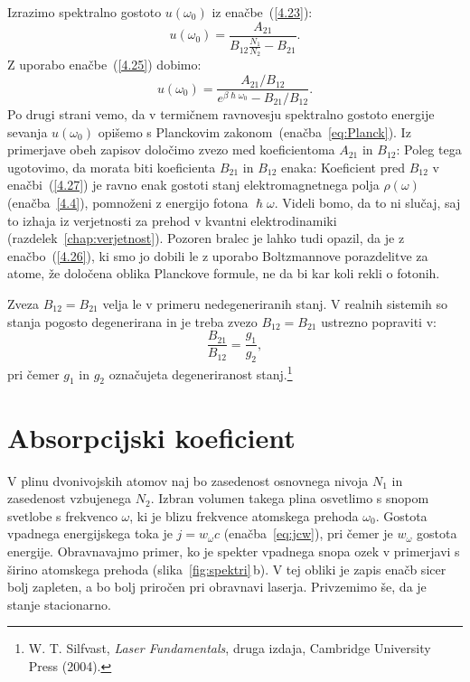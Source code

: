 Izrazimo spektralno gostoto $u(\omega_0)$ 
iz enačbe~(\ref{4.23}):
\begin{equation}
u(\omega_{0})=\frac{A_{21}}{B_{12}\frac{N_{1}}{N_{2}}-B_{21}}.
\label{4.24}
\end{equation}
Z uporabo enačbe~(\ref{4.25}) dobimo:
\begin{equation}
u(\omega_{0})=\frac{A_{21}/B_{12}}{e^{\beta\hslash\omega_{0}}-B_{21}/B_{12}}.
\label{4.26}
\end{equation}
Po drugi strani vemo, da v termičnem ravnovesju spektralno gostoto energije sevanja
$u(\omega_0)$ opišemo s Planckovim zakonom~(enačba~\ref{eq:Planck}).
Iz primerjave obeh zapisov določimo zvezo med koeficientoma $A_{21}$ in $B_{12}$:
Poleg tega ugotovimo, da morata biti koeficienta $B_{21}$ in $B_{12}$ enaka:
Koeficient pred $B_{12}$ v enačbi~(\ref{4.27}) je ravno enak gostoti stanj elektromagnetnega polja 
$\rho(\omega)$ (enačba~\ref{4.4}), pomnoženi z energijo fotona $\hslash\omega$. 
Videli bomo, da to ni slučaj, saj to izhaja iz verjetnosti za prehod v kvantni 
elektrodinamiki (razdelek~\ref{chap:verjetnost}).
Pozoren bralec je lahko tudi opazil, da je z enačbo~(\ref{4.26}),
ki smo jo dobili le z uporabo Boltzmannove porazdelitve za atome, že
določena oblika Planckove formule, ne da bi kar koli rekli o fotonih.

\begin{remark}
 Zveza $B_{12}=B_{21}$ velja le v primeru nedegeneriranih stanj. V realnih sistemih
 so stanja pogosto degenerirana in je treba zvezo $B_{12}=B_{21}$ ustrezno popraviti v:
\begin{equation}
\frac{B_{21}}{B_{12}} = \frac{g_1}{g_2},
\label{eq:ABdeg}
\end{equation}
pri čemer $g_{1}$ in $g_2$ označujeta degeneriranost 
stanj.\footnote{W. T. Silfvast, {\it Laser Fundamentals}, druga izdaja, Cambridge University Press (2004).}
\end{remark}

\section{Absorpcijski koeficient}
V plinu dvonivojskih atomov naj bo zasedenost osnovnega nivoja $N_1$ in zasedenost vzbujenega
$N_2$. Izbran volumen takega plina osvetlimo s snopom svetlobe s frekvenco
$\omega$, ki je blizu frekvence atomskega prehoda $\omega_{0}$. Gostota
vpadnega energijskega toka je $j=w_{\omega}c$ (enačba~\ref{eq:jcw}), 
pri čemer je $w_{\omega}$ gostota energije. Obravnavajmo primer, ko je 
spekter vpadnega snopa ozek v primerjavi s širino atomskega prehoda
(slika~\ref{fig:spektri}\,b). V tej obliki je zapis enačb sicer bolj zapleten,
a bo bolj priročen pri obravnavi laserja. Privzemimo še, da
je stanje stacionarno. 

